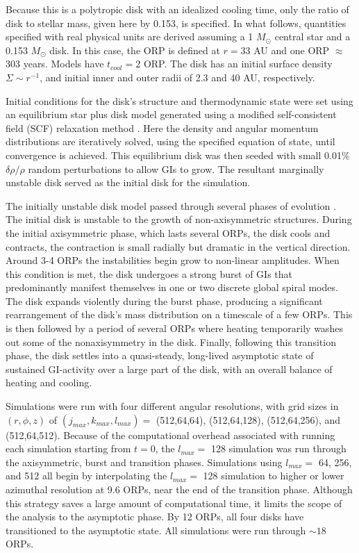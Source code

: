 \documentclass[manuscript]{aastex}
\begin{document}
Because this is a polytropic disk with an idealized cooling time, only the ratio of disk to stellar mass, given here by 0.153, is specified.  In what follows, quantities specified with real physical units are derived assuming a 1 $M_\odot$ central star and a 0.153  $M_\odot$ disk. In this case, the ORP is defined at $r = 33$ AU and one ORP $\approx$ 303 years.  Models have $t_{cool} = 2$ ORP. The disk has an initial surface density $\Sigma \sim r^{ -1}$, and initial inner and outer radii of 2.3 and 40 AU, respectively.  

Initial conditions for the disk's structure and thermodynamic state were set using an equilibrium star plus disk model generated using a modified \citet{hachisu1986} self-consistent field (SCF) relaxation method \citep{pickett1996,pickett2003,mejiaphd2004,mejia2005,cai2006}. Here  the density and angular momentum distributions are iteratively solved, using the specified equation of state,  until convergence is achieved. This  equilibrium disk was then seeded with small 0.01\% $\delta\rho/\rho$ random perturbations to allow GIs to grow.  The resultant marginally unstable disk served as the initial disk for the simulation.

The initially unstable disk model passed through several phases of evolution \citep[see also][]{pickett2003, mejia2005}.  The initial disk is unstable to the growth of non-axisymmetric structures. During the initial axisymmetric phase, 
which lasts several ORPs, the disk cools and contracts, the contraction is small radially but dramatic in the vertical direction. Around 3-4 ORPs the instabilities begin grow to non-linear amplitudes. When this condition is met, the disk undergoes a strong burst of GIs that predominantly manifest themselves in one or two discrete global spiral modes.  The disk expands violently during the burst phase, producing a significant rearrangement of the disk's mass distribution on a timescale of a few ORPs. This is then followed by a period of several ORPs where heating temporarily washes out some of the nonaxisymmetry in the disk.  Finally, following this transition phase, the disk settles into a quasi-steady, long-lived asymptotic state of sustained GI-activity over a large part of the disk, with an overall balance of heating and cooling.

Simulations were run with four different angular resolutions, with grid sizes in $(r,\phi,z)$ of  $(j_{max}, k_{max}, l_{max}) =$ (512,64,64), (512,64,128), (512,64,256), and (512,64,512). Because of the computational overhead associated with running each simulation starting from $t = 0$, the $l_{max} =$ 128 simulation was run through the axisymmetric, burst and transition phases. Simulations using $l_{max} =$ 64, 256, and 512 all begin by interpolating the $l_{max} =$ 128 simulation to higher or lower azimuthal resolution at 9.6 ORPs, near the end of the transition
phase. Although this strategy saves a large amount of computational time, it limits the scope of the analysis to the asymptotic phase. By 12 ORPs, all four disks have transitioned to the asymptotic state.  All simulations were 
run through $\sim 18$ ORPs.
\end{document}

